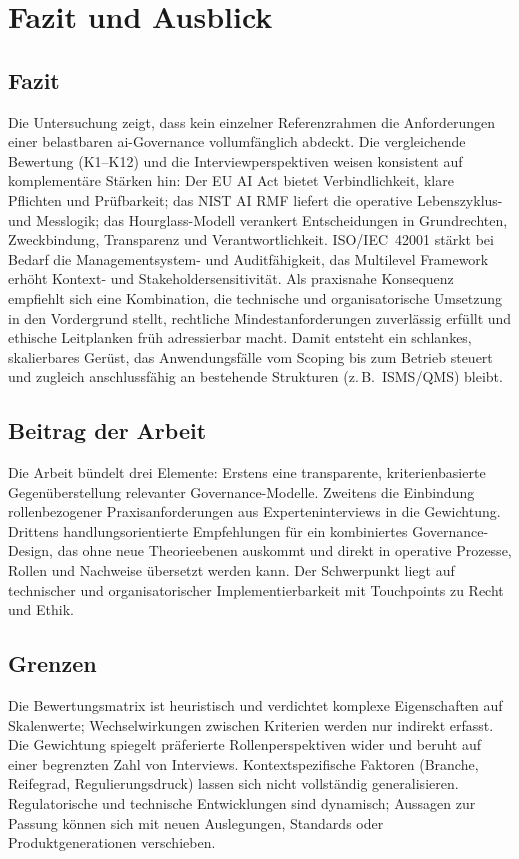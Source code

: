 \section{Fazit und Ausblick}
\label{sec:fazit}

\subsection{Fazit}
Die Untersuchung zeigt, dass kein einzelner Referenzrahmen die Anforderungen einer belastbaren \ac{ai}-Governance vollumfänglich abdeckt.
Die vergleichende Bewertung (K1–K12) und die Interviewperspektiven weisen konsistent auf komplementäre Stärken hin:
Der EU AI Act bietet Verbindlichkeit, klare Pflichten und Prüfbarkeit; das NIST AI RMF liefert die operative Lebenszyklus- und Messlogik; das Hourglass-Modell verankert Entscheidungen in Grundrechten, Zweckbindung, Transparenz und Verantwortlichkeit.
ISO/IEC~42001 stärkt bei Bedarf die Managementsystem- und Auditfähigkeit, das Multilevel Framework erhöht Kontext- und Stakeholdersensitivität.
Als praxisnahe Konsequenz empfiehlt sich eine Kombination, die technische und organisatorische Umsetzung in den Vordergrund stellt, rechtliche Mindestanforderungen zuverlässig erfüllt und ethische Leitplanken früh adressierbar macht.
Damit entsteht ein schlankes, skalierbares Gerüst, das Anwendungsfälle vom Scoping bis zum Betrieb steuert und zugleich anschlussfähig an bestehende Strukturen (z.\,B.\ ISMS/QMS) bleibt.

\subsection{Beitrag der Arbeit}
Die Arbeit bündelt drei Elemente: Erstens eine transparente, kriterienbasierte Gegenüberstellung relevanter Governance-Modelle.
Zweitens die Einbindung rollenbezogener Praxisanforderungen aus Experteninterviews in die Gewichtung.
Drittens handlungsorientierte Empfehlungen für ein kombiniertes Governance-Design, das ohne neue Theorieebenen auskommt und direkt in operative Prozesse, Rollen und Nachweise übersetzt werden kann.
Der Schwerpunkt liegt auf technischer und organisatorischer Implementierbarkeit mit Touchpoints zu Recht und Ethik.

\subsection{Grenzen}
Die Bewertungsmatrix ist heuristisch und verdichtet komplexe Eigenschaften auf Skalenwerte; Wechselwirkungen zwischen Kriterien werden nur indirekt erfasst.
Die Gewichtung spiegelt präferierte Rollenperspektiven wider und beruht auf einer begrenzten Zahl von Interviews.
Kontextspezifische Faktoren (Branche, Reifegrad, Regulierungsdruck) lassen sich nicht vollständig generalisieren.
Regulatorische und technische Entwicklungen sind dynamisch; Aussagen zur Passung können sich mit neuen Auslegungen, Standards oder Produktgenerationen verschieben.

